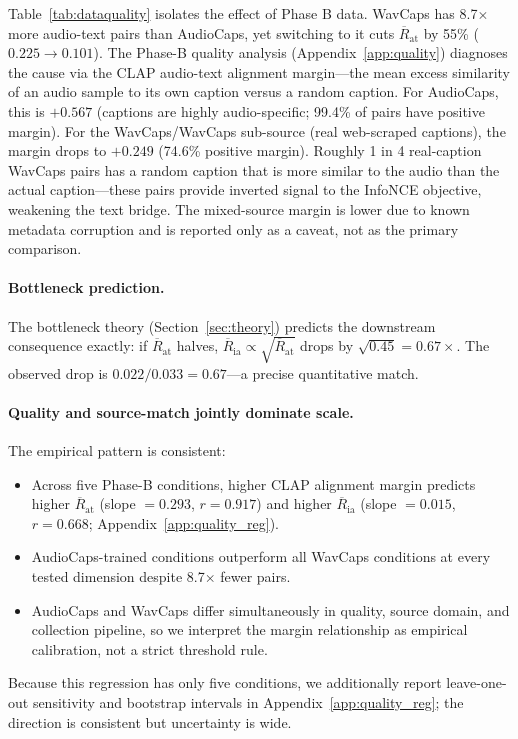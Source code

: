 \documentclass{article}
\newcommand{\avgR}{\overline{R}}
\begin{document}
Table~\ref{tab:dataquality} isolates the effect of Phase B data.
WavCaps has 8.7$\times$ more audio-text pairs than AudioCaps, yet switching to it cuts $\avgR_\mathrm{at}$ by 55\% ($0.225 \to 0.101$).
The Phase-B quality analysis (Appendix~\ref{app:quality}) diagnoses the cause via the CLAP audio-text alignment margin---the mean excess similarity of an audio sample to its own caption versus a random caption.
For AudioCaps, this is $+0.567$ (captions are highly audio-specific; 99.4\% of pairs have positive margin).
For the WavCaps/WavCaps sub-source (real web-scraped captions), the margin drops to $+0.249$ (74.6\% positive margin).
Roughly 1 in 4 real-caption WavCaps pairs has a random caption that is more similar to the audio than the actual caption---these pairs provide inverted signal to the InfoNCE objective, weakening the text bridge.
The mixed-source margin is lower due to known metadata corruption and is reported only as a caveat, not as the primary comparison.

\paragraph{Bottleneck prediction.}
The bottleneck theory (Section~\ref{sec:theory}) predicts the downstream consequence exactly:
if $\avgR_\mathrm{at}$ halves, $\avgR_\mathrm{ia} \propto \sqrt{\avgR_\mathrm{at}}$ drops by $\sqrt{0.45} = 0.67\times$.
The observed drop is $0.022/0.033 = 0.67$---a precise quantitative match.

\paragraph{Quality and source-match jointly dominate scale.}
The empirical pattern is consistent:
\begin{itemize}[topsep=2pt,itemsep=1pt,parsep=0pt]
  \item Across five Phase-B conditions, higher CLAP alignment margin predicts higher $\avgR_\mathrm{at}$ (slope $=0.293$, $r=0.917$) and higher $\avgR_\mathrm{ia}$ (slope $=0.015$, $r=0.668$; Appendix~\ref{app:quality_reg}).
  \item AudioCaps-trained conditions outperform all WavCaps conditions at every tested dimension despite 8.7$\times$ fewer pairs.
  \item AudioCaps and WavCaps differ simultaneously in quality, source domain, and collection pipeline, so we interpret the margin relationship as empirical calibration, not a strict threshold rule.
\end{itemize}
Because this regression has only five conditions, we additionally report leave-one-out sensitivity and bootstrap intervals in Appendix~\ref{app:quality_reg}; the direction is consistent but uncertainty is wide.
\end{document}
